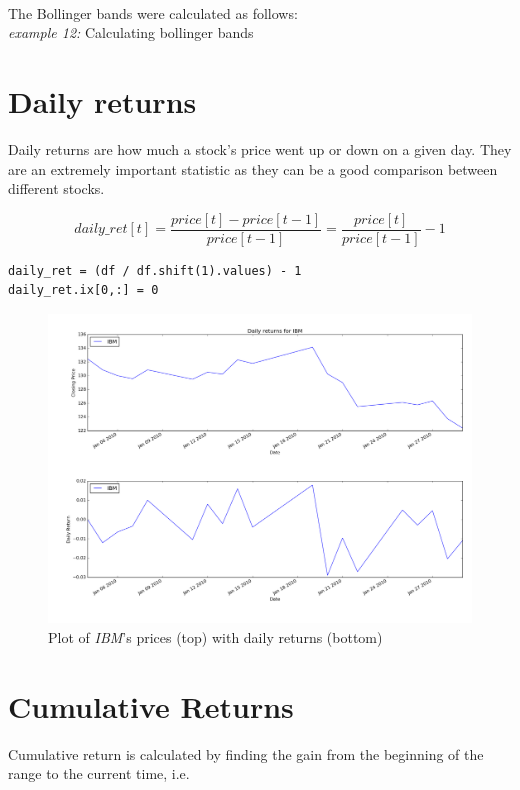 \noindent The Bollinger bands\textsuperscript{\textregistered} were calculated as follows:\\

\noindent\textit{example 12:} Calculating bollinger bands



\section{Daily returns}
\noindent Daily returns are how much a stock's price went up or down on a given day. They are an extremely important statistic as they can be a good comparison between different stocks.

\begin{equation*}
	daily\_ret[t] = \frac{price[t]-price[t-1]}{price[t-1]} = \frac{price[t]}{price[t-1]}-1
\end{equation*}

\begin{lstlisting}[style=python]
daily_ret = (df / df.shift(1).values) - 1
daily_ret.ix[0,:] = 0
\end{lstlisting}

\begin{figure}[h!]
	\centering
	\includegraphics[width=\textwidth]{images/daily_returns.png}
    \caption{Plot of \textit{IBM}'s prices (top) with daily returns (bottom)}
\end{figure}

\section{Cumulative Returns}
\noindent Cumulative return is calculated by finding the gain from the beginning of the range to the current time, i.e.

